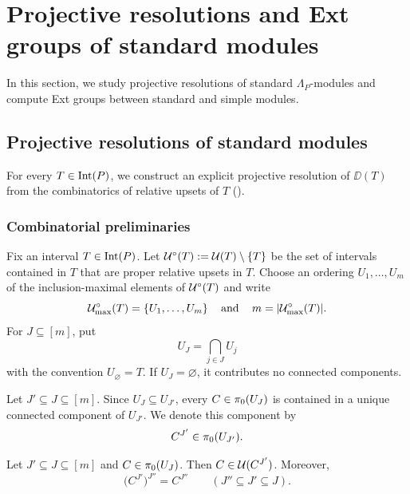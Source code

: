 \section{Projective resolutions and Ext groups of standard modules}
\label{sec:projective-resolutions-ext-groups-standard-modules}

In this section, we study projective resolutions of standard
$\Lambda_P$-modules and compute Ext groups between standard and simple modules.

\subsection{Projective resolutions of standard modules}
\label{sec:projective-resolutions-standard-modules}

For every $T\in\operatorname{Int}(P)$, we construct an explicit projective
resolution of $\DD(T)$ from the combinatorics of relative upsets of
$T$ (). 

\subsubsection{Combinatorial preliminaries}
\label{subsec:projective-resolution-combinatorics}

Fix an interval $T\in\operatorname{Int}(P)$.  
Let $\mathcal U^{\circ}(T):=\mathcal U(T)\setminus\{T\}$ be the set of intervals contained in $T$ that are proper relative upsets in $T$. 
Choose an ordering $U_1,\ldots,U_m$ of the inclusion-maximal elements
of $\mathcal U^\circ(T)$ and write
\begin{equation}
\mathcal U^\circ_{\max}(T)=\{U_1,\ldots,U_m\}
\operatorname{\quad \text{and} \quad}\nolimits
m=|\mathcal U^\circ_{\max}(T)|.
\label{eq:maximal-proper-relative-upsets}
\end{equation}
For $J\subseteq[m]$, put
\[
U_J=\bigcap_{j\in J}U_j
\]
with the convention $U_\varnothing=T$. 
If $U_J=\varnothing$, it contributes no
connected components.

Let $J'\subseteq J\subseteq[m]$. Since $U_J\subseteq U_{J'}$, every
$C\in\pi_0(U_J)$ is contained in a unique connected component of
$U_{J'}$. We denote this component by
\[
C^{J'}\in\pi_0(U_{J'}).
\]

\begin{lemma}
\label{lem:projective-resolution-face-components}
Let $J'\subseteq J\subseteq[m]$ and
$C\in\pi_0(U_J)$. Then $C\in \mathcal U(C^{J'})$.
Moreover,
\begin{equation}
\label{eq:face-component-functoriality}
\bigl(C^{J'}\bigr)^{J''}
=
C^{J''}
\qquad
(J''\subseteq J'\subseteq J).
\end{equation}
\end{lemma}

